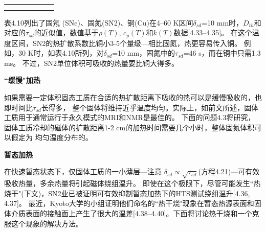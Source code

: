 \begin{table}[htbp]
\begin{tabular}{|c||c|c|c|c|c|c|}
		&                                                                                                 &                                                                                                                    &                                                                                                                      &                                                                                                   &                                                                                                         &                                                                                                      \\
		&                                                                                                 &                                                                                                                    &                                                                                                                      &                                                                                                   &                                                                                                         &                                                                                                      \\ 
\hline
\end{tabular}
\end{table}

表4.10列出了固氖 (SNe)、固氮(SN2)、铜(Cu)在4–60 K区间$\delta_{sd}$=10 mm时，$D_{th}$和对应的$\tau_{sd}$的近似值，数值基于$\rho(T)$, $c_p(T)$和$k(T)$数据[4.33–4.35]。
在这个温度区间，SN2的热扩散系数比铜小3-5个量级---相比固氮，热更容易传入铜。
例如，30 K时，如表4.10所列，对$\delta_{sd}$=10 mm，固氮中的$\tau_{sd}$=46 s，而在铜中只需1.3 ms。
不过，SN2单位体积可吸收的热量要比铜大得多。

\textbf{``缓慢"加热}

如果需要一定体积固态工质在合适的热扩散距离下吸收的热可以是缓慢吸收的，也即时间比$\tau_{sd}$长得多，
整个固体将维持近乎温度均匀。实际上，如前文所述，固体工质用于通常运行于永久模式的MRI和NMR是最佳的。
下面的问题4.3将研究，固体工质冷却的磁体的扩散距离1-2 cm的加热时间需要几个小时，整体固氮体积可以假定为
均匀温度分布的。

\textbf{暂态加热}

在快速暂态状态下，仅固体工质的一小薄层---注意
$\delta_{sd}\propto\sqrt{\tau_{sd}}$(方程4.21)---可有效吸收热量，多余热量将引起磁体绕组温升。
即使在这个极限下，尽管可能发生``热烧干"(下文)，SN2业已被证明可有效抑制暂态加热下的HTS测试绕组温升[4.36, 4.37]。
最近，Kyoto大学的小组证明他们命名的``热干烧"现象在暂态热源表面和固体介质表面的接触面上产生了很大的温差[4.38–4.40]。下面将讨论热干烧和一个克服这个现象的解决方法。

